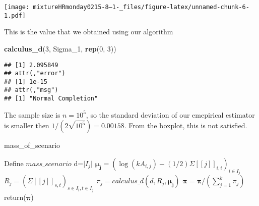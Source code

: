 \documentclass[
]{article}
\newenvironment{Shaded}{\begin{snugshade}}{\end{snugshade}}
\newcommand{\DecValTok}[1]{\textcolor[rgb]{0.00,0.00,0.81}{#1}}
\newcommand{\FunctionTok}[1]{\textcolor[rgb]{0.13,0.29,0.53}{\textbf{#1}}}
\newcommand{\NormalTok}[1]{#1}
\begin{document}
\texttt{[image: mixtureHRmonday0215-8--1-\_files/figure-latex/unnamed-chunk-6-1.pdf]}

This is the value that we obtained using our algorithm

\begin{Shaded}
\begin{Highlighting}[]
\FunctionTok{calculus\_d}\NormalTok{(}\DecValTok{3}\NormalTok{, Sigma\_1, }\FunctionTok{rep}\NormalTok{(}\DecValTok{0}\NormalTok{, }\DecValTok{3}\NormalTok{))}
\end{Highlighting}
\end{Shaded}

\begin{verbatim}
## [1] 2.095849
## attr(,"error")
## [1] 1e-15
## attr(,"msg")
## [1] "Normal Completion"
\end{verbatim}

The sample size is \(n=10^{5}\), so the standard deviation of our
emepirical estimator is smaller then \(1/(2\sqrt{10^5})=0.00158\). From
the boxplot, this is not satisfied.

\begin{algorithm}[H]
\caption{ mass\_of\_scenario }
\begin{algorithmic}[1]
\State Define $ mass\_scenario$ 
 
\State d=$\lvert I_j \rvert$
\State $\boldsymbol{\mu_j}=(\log(kA_{i,j})-(1/2)\Sigma[[j]]_{i,i})_{i \in I_j}$
\State $R_j=(\Sigma[[j]]_{s,t})_{s \in I_i, t \in I_j}$
\State $\pi_j=calculus\_d(d,R_j,\boldsymbol{\mu_j})$
\EndFor
\State $\boldsymbol{\pi}=\boldsymbol{\pi}/(\sum_{j=1}^{k} \pi_j) $
\State return($\boldsymbol{\pi}$)
\EndFunction
\end{algorithmic}
\end{algorithm}
\end{document}
